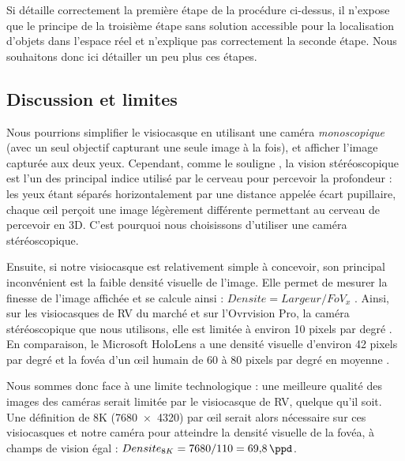 Si \cite{Steptoe2013} détaille correctement la première étape de la procédure ci-dessus, il n'expose que le principe de la troisième étape sans solution accessible pour la localisation d'objets dans l'espace réel et n'explique pas correctement la seconde étape. Nous souhaitons donc ici détailler un peu plus ces étapes.

\subsection{Discussion et limites}
Nous pourrions simplifier le visiocasque en utilisant une caméra \emph{monoscopique} (avec un seul objectif capturant une seule image à la fois), et afficher l'image capturée aux deux yeux. Cependant, comme le souligne \cite{Bourke1999}, la vision stéréoscopique est l'un des principal indice utilisé par le cerveau pour percevoir la profondeur : les yeux étant séparés horizontalement par une distance appelée écart pupillaire, chaque \oe il perçoit une image légèrement différente  permettant au cerveau de percevoir en 3D. C'est pourquoi nous choisissons d'utiliser une caméra stéréoscopique.


Ensuite, si notre visiocasque est relativement simple à concevoir, son principal inconvénient est la faible densité visuelle de l'image. Elle permet de mesurer la finesse de l'image affichée et se calcule ainsi : $Densite = Largeur / FoV_x$ \citep{Boger2017}. Ainsi, sur les visiocasques de RV du marché et sur l'Ovrvision Pro, la caméra stéréoscopique que nous utilisons, elle est limitée à environ 10 pixels par degré . En comparaison, le Microsoft HoloLens a une densité visuelle d'environ 42 pixels par degré et la fovéa d'un \oe il humain de 60 à 80 pixels par degré en moyenne \citep{Kistner2014}.

Nous sommes donc face à une limite technologique : une meilleure qualité des images des caméras serait limitée par le visiocasque de RV, quelque qu'il soit. Une définition de 8K (\SI{7680x4320}{\px}) par \oe il serait alors nécessaire sur ces visiocasques et notre caméra pour atteindre la densité visuelle de la fovéa, à champs de vision égal : $Densite_{8K} = 7680 / 110 = \SI{69.8}{\ppd}$.

